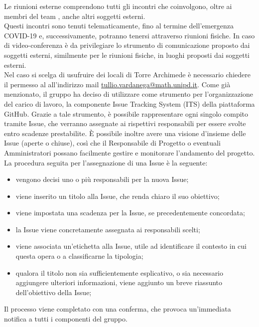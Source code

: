 				Le riunioni esterne comprendono tutti gli incontri che coinvolgono, oltre ai membri del team \Gruppo{}, anche altri soggetti esterni.\\
				Questi incontri sono tenuti telematicamente, fino al termine dell'emergenza COVID-19 e, successivamente, potranno tenersi attraverso riunioni fisiche. In caso di video-conferenza è da privilegiare lo strumento di comunicazione proposto dai soggetti esterni, similmente per le riunioni fisiche, in luoghi proposti dai soggetti esterni.\\
				Nel caso si scelga di usufruire dei locali di Torre Archimede è necessario chiedere il permesso al \TV{} all'indirizzo mail \href{mailto:tullio.vardanega@math.unipd.it}{tullio.vardanega@math.unipd.it}.	
			Come già menzionato, il gruppo ha deciso di utilizzare come strumento per l'organizzazione del carico di lavoro, la componente Issue Tracking System (ITS) della piattaforma GitHub. Grazie a tale strumento, è possibile rappresentare ogni singolo compito tramite Issue, che verranno assegnate ai rispettivi responsabili per essere svolte entro scadenze prestabilite. È possibile inoltre avere una visione d'insieme delle Issue (aperte o chiuse), così che il Responsabile di Progetto o eventuali Amministratori possano facilmente gestire e monitorare l'andamento del progetto.
			La procedura seguita per l'assegnazione di una Issue è la seguente:
			\begin{itemize}
				\item vengono decisi uno o più responsabili per la nuova Issue;
				\item viene inserito un titolo alla Issue, che renda chiaro il suo obiettivo;
				\item viene impostata una scadenza per la Issue, se precedentemente concordata;
				\item la Issue viene concretamente assegnata ai responsabili scelti;
				\item viene associata un'etichetta alla Issue, utile ad identificare il contesto in cui questa opera o a classificarne la tipologia;
				\item qualora il titolo non sia sufficientemente esplicativo, o sia necessario aggiungere ulteriori informazioni, viene aggiunto un breve riassunto dell'obiettivo della Issue;		
			\end{itemize}
			Il processo viene completato con una conferma, che provoca un'immediata notifica a tutti i componenti del gruppo.
				
